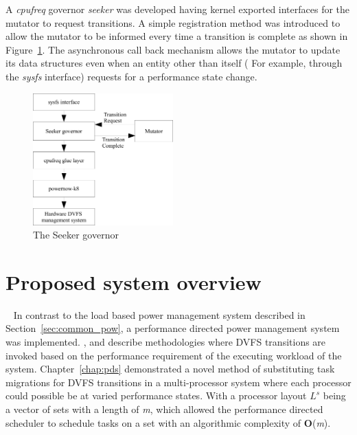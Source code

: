 A \textit{cpufreq} governor \textit{seeker}
was developed having kernel exported interfaces for the mutator to request transitions. 
A simple registration method was introduced to allow the mutator to be informed 
every time a transition is complete as shown in Figure~\ref{fig:governor}. 
The asynchronous call back mechanism allows the mutator to
update its data structures even when an entity other than itself ( For example, through
the \textit{sysfs} interface) requests for a performance state change. 

\begin{figure}[h!]
  \begin{center}
    \includegraphics[height=2in]{figures/seeker_governor.jpg}
    \caption{The Seeker governor}
    \label{fig:governor}
  \end{center}
\end{figure}

\section{Proposed system overview}~\label{sec:layout}
In contrast to the load based power management system described in Section~\ref{sec:common_pow},
a performance directed power management system was implemented. 
\cite{AnIntraTask}, \cite{LiveRuntime} and \cite{Phaseaware} describe methodologies where
DVFS transitions are invoked based on the performance requirement of the executing 
workload of the system. Chapter~\ref{chap:pds} demonstrated a novel method of substituting 
task migrations for DVFS transitions in a multi-processor system where each processor
could possible be at varied performance states. With a processor layout $L^s$ being a
vector of sets with a length of \textit{m}, which allowed the performance directed scheduler
to schedule tasks on a set with an algorithmic complexity of \textbf{O}(\textit{m}). 

